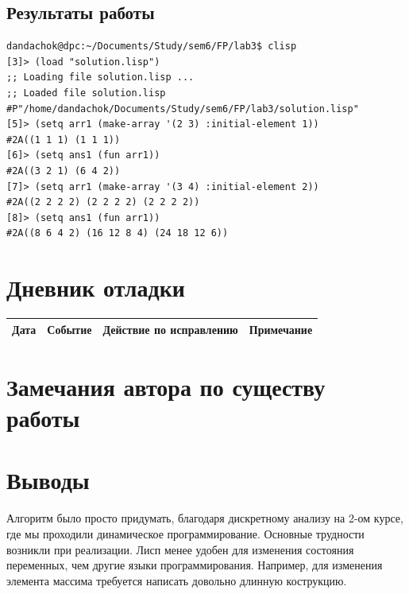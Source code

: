 \documentclass[12pt]{article}
\begin{document}
\pagebreak

\subsection{Результаты работы}
\begin{lstlisting}
dandachok@dpc:~/Documents/Study/sem6/FP/lab3$ clisp
[3]> (load "solution.lisp")
;; Loading file solution.lisp ...
;; Loaded file solution.lisp
#P"/home/dandachok/Documents/Study/sem6/FP/lab3/solution.lisp"
[5]> (setq arr1 (make-array '(2 3) :initial-element 1))
#2A((1 1 1) (1 1 1))
[6]> (setq ans1 (fun arr1))
#2A((3 2 1) (6 4 2))
[7]> (setq arr1 (make-array '(3 4) :initial-element 2))
#2A((2 2 2 2) (2 2 2 2) (2 2 2 2))
[8]> (setq ans1 (fun arr1))
#2A((8 6 4 2) (16 12 8 4) (24 18 12 6))
\end{lstlisting}

\section{Дневник отладки}
\begin{tabular}{|c|c|c|c|}
\hline
Дата & Событие & Действие по исправлению & Примечание \\
\hline
\end{tabular}

\section{Замечания автора по существу работы}

\section{Выводы}
Алгоритм было просто придумать, благодаря дискретному анализу на 2-ом курсе, где мы проходили динамическое программирование.
Основные трудности возникли при реализации. Лисп менее удобен для изменения состояния переменных, чем другие языки программирования. Например, для изменения элемента массима требуется написать довольно длинную кострукцию.
\end{document}
